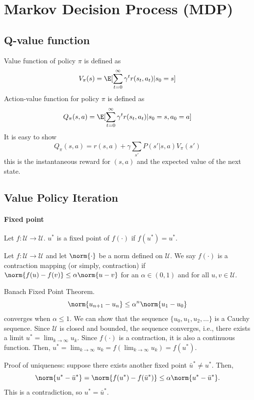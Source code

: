 \chapter{Markov Decision Process (MDP)}


\section{Q-value function}
Value function of policy $\pi$ is defined as
\[
    V_\pi(s) = \E[\sum_{t=0}^{\infty} \gamma^t r(s_t, a_t)|s_0 = s]
\]
Action-value function for policy $\pi$ is defined as
\[
    Q_\pi(s, a) = \E [\sum_{t=0}^{\infty} \gamma^t r(s_t, a_t)|s_0=s, a_0=a]
\]
It is easy to show
\[
    Q_\pi(s, a) = r(s, a) + \gamma \sum_{s'} P(s' | s, a) V_\pi (s')
\]
this is the instantaneous reward for $(s,a)$ and the expected value of the next state.

\section{Value Policy Iteration}
\subsubsection{Fixed point}
Let $f : \mathcal{U} \to \mathcal{U}$. $u^*$ is a fixed point of $f(\cdot)$ if $f(u^*) = u^*$.

Let $f : \mathcal{U} \to \mathcal{U}$ and let $\norm{\cdot}$ be a norm defined on $\mathcal{U}$. We say $f(\cdot)$ is a contraction mapping (or simply,
contraction) if $\norm{f(u) - f(v)} \leq \alpha\norm{u-v}$ for an $\alpha \in (0, 1)$ and for all $u, v \in \mathcal{U}$.

Banach Fixed Point Theorem.
\[
    \norm{u_{n+1} - u_n} \leq \alpha^n \norm{u_1 - u_0}
\]
converges when $\alpha \leq 1$. We can show that the sequence $\{u_0, u_1, u_2, \dots \}$ is a Cauchy sequence. Since $\mathcal{U}$ is closed and bounded,
the sequence converges, i.e., there exists a limit $u^* = \lim_{k \to \infty} u_k$. Since $f(\cdot)$ is a contraction,
it is also a continuous function. Then, $u^* = \lim_{k\to\infty} u_k = f(\lim_{k\to\infty} u_k) = f(u^*)$.

Proof of uniqueness: suppose there exists another fixed point $\bar{u}^* \neq u^*$. Then,
\[
    \norm{u^* - \bar{u}^*} = \norm{f(u^*) - f(\bar{u}^*)} \leq \alpha \norm{u^* - \bar{u}^*}.
\]
This is a contradiction, so $u^* = \bar{u}^*$.

